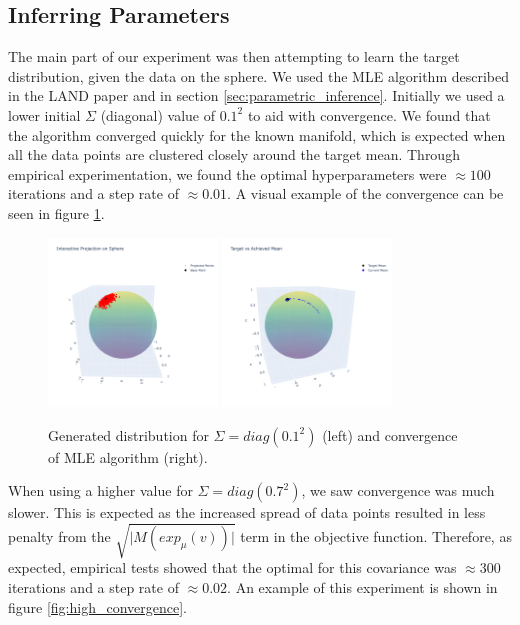 \documentclass{article}
\begin{document}
\subsection{Inferring Parameters}
The main part of our experiment was then attempting to learn the target distribution, given the data on the sphere. We used the MLE algorithm described in the LAND paper and in section \ref{sec:parametric_inference}. Initially we used a lower initial $\Sigma$ (diagonal) value of $0.1^2$ to aid with convergence. We found that the algorithm converged quickly for the known manifold, which is expected when all the data points are clustered closely around the target mean. Through empirical experimentation, we found the optimal hyperparameters were $\approx 100$ iterations and a step rate of $\approx 0.01$. A visual example of the convergence can be seen in figure \ref{fig:convergence}. 

\begin{figure}[h]
    \centering
    \includegraphics[width=0.4\textwidth]{plots/small_cov_proj.png}
    \includegraphics[width=0.4\textwidth]{plots/small_cov_no_projs.png}
    \caption{Generated distribution for $\Sigma=diag(0.1^2)$ (left) and convergence of MLE algorithm (right).}
    \label{fig:convergence}
\end{figure}

When using a higher value for $\Sigma = diag(0.7^2)$, we saw convergence was much slower. This is expected as the increased spread of data points resulted in less penalty from the $\sqrt{\vert M(exp_{\mu}(v))\vert}$ term in the objective function. Therefore, as expected, empirical tests showed that the optimal for this covariance was $\approx 300$ iterations and a step rate of $\approx 0.02$. An example of this experiment is shown in figure \ref{fig:high_convergence}.
\end{document}
